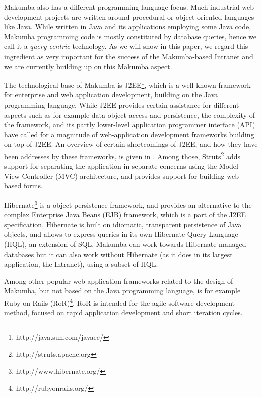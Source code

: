 \documentclass{llncs}
\begin{document}
Makumba also has a different programming language focus. Much industrial web development projects are written around procedural or object-oriented languages like  Java. While written in Java and its applications employing some Java code, Makumba programming code is mostly constituted by database queries, hence we call it a \textit{query-centric} technology. As we will show in this paper, we regard this ingredient as very important for the success of the Makumba-based Intranet and we are currently building up on this Makumba aspect.

The technological base of Makumba is J2EE\footnote{http://java.sun.com/javaee/}, which is a well-known framework for enterprise and web application development, building on the Java programming language. While J2EE provides certain assistance for different aspects such as for example data object access and persistence, the complexity of the framework, and its partly lower-level application programmer interface (API) have called for a magnitude of web-application development frameworks building on top of J2EE. An overview of certain shortcomings of J2EE, and how they have been addresses by these frameworks, is given in \cite{johnson2005jdf}. Among those, Struts\footnote{http://struts.apache.org} adds support for separating the application in separate concerns using the Model-View-Controller (MVC) architecture, and provides support for building web-based forms. 

Hibernate\footnote{http://www.hibernate.org/} is a object persistence framework, and provides an alternative to the complex Enterprise Java Beans (EJB) framework, which is a part of the J2EE specification. Hibernate is built on idiomatic, transparent persistence of Java objects, and allows to express queries in its own Hibernate Query Language (HQL), an extension of SQL. Makumba can work towards Hibernate-managed databases but it can also work without Hibernate (as it does in its largest application, the Intranet), using a subset of HQL.

Among other popular web application frameworks related to the design of Makumba, but not based on the Java programming language, is for example Ruby on Rails (RoR)\footnote{http://rubyonrails.org/}. RoR is intended for the agile software development method, focused on rapid application development and short iteration cycles.
\end{document}
